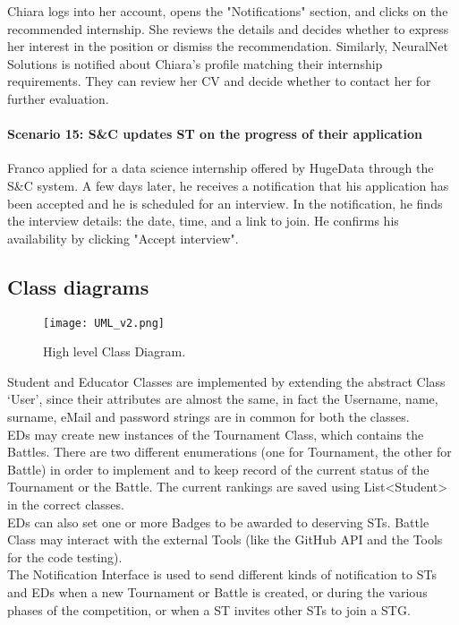 Chiara logs into her account, opens the "Notifications" section, and clicks on the recommended internship. She reviews the details and decides whether to express her interest in the position or dismiss the recommendation. Similarly, NeuralNet Solutions is notified about Chiara's profile matching their internship requirements. They can review her CV and decide whether to contact her for further evaluation.

\paragraph{Scenario 15: S\&C updates ST on the progress of their application}
Franco applied for a data science internship offered by HugeData through the S\&C system. A few days later, he receives a notification that his application has been accepted and he is scheduled for an interview. In the notification, he finds the interview details: the date, time, and a link to join. He confirms his availability by clicking "Accept interview".

\newpage

\subsection{Class diagrams}
\label{subsec:class_diagrams}%

\begin{figure}[H]
    \begin{center}
        \texttt{[image: UML\_v2.png]}
        \caption{High level Class Diagram.}
        \label{fig:UML}%
    \end{center}
\end{figure}

Student and Educator Classes are implemented by extending the abstract Class ‘User’, since their attributes are almost the same, in fact the Username, name, surname, eMail and password strings are in common for both the classes.\\
EDs may create new instances of the Tournament Class, which contains the Battles. There are two different enumerations (one for Tournament, the other for Battle) in order to implement and to keep record of the current status of the Tournament or the Battle. The current rankings are saved using List<Student> in the correct classes. \\
EDs can also set one or more Badges to be awarded to deserving STs. Battle Class may interact with the external Tools (like the GitHub API and the Tools for the code testing). \\
The Notification Interface is used to send different kinds of notification to STs and EDs when a new Tournament or Battle is created, or during the various phases of the competition, or when a ST invites other STs to join a STG.\\


